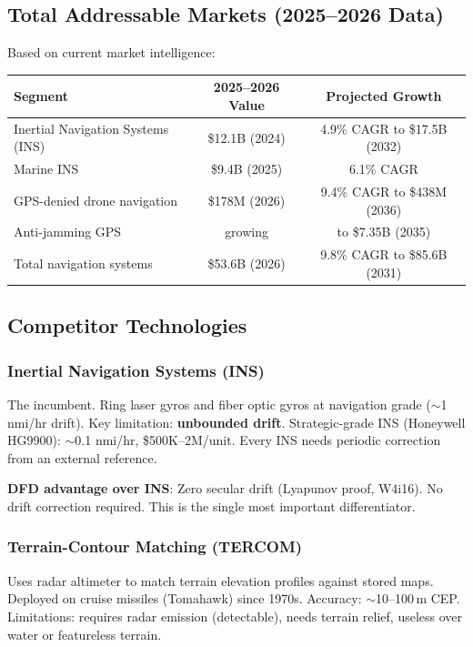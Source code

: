 \documentclass[11pt]{article}
\theoremstyle{definition}
\theoremstyle{remark}
\begin{document}
\subsection{Total Addressable Markets (2025--2026 Data)}

Based on current market intelligence:

\begin{center}
\begin{tabular}{lcc}
\toprule
\textbf{Segment} & \textbf{2025--2026 Value} & \textbf{Projected Growth} \\
\midrule
Inertial Navigation Systems (INS) & \$12.1B (2024) & 4.9\% CAGR to \$17.5B (2032) \\
Marine INS & \$9.4B (2025) & 6.1\% CAGR \\
GPS-denied drone navigation & \$178M (2026) & 9.4\% CAGR to \$438M (2036) \\
Anti-jamming GPS & growing & to \$7.35B (2035) \\
Total navigation systems & \$53.6B (2026) & 9.8\% CAGR to \$85.6B (2031) \\
\bottomrule
\end{tabular}
\end{center}

\subsection{Competitor Technologies}

\subsubsection{Inertial Navigation Systems (INS)}

The incumbent. Ring laser gyros and fiber optic gyros at navigation grade
($\sim$1 nmi/hr drift). Key limitation: \textbf{unbounded drift}.
Strategic-grade INS (Honeywell HG9900): $\sim$0.1 nmi/hr, \$500K--2M/unit.
Every INS needs periodic correction from an external reference.

\textbf{DFD advantage over INS}: Zero secular drift (Lyapunov proof, W4i16).
No drift correction required. This is the single most important differentiator.

\subsubsection{Terrain-Contour Matching (TERCOM)}

Uses radar altimeter to match terrain elevation profiles against stored maps.
Deployed on cruise missiles (Tomahawk) since 1970s. Accuracy: $\sim$10--100\,m CEP.
Limitations: requires radar emission (detectable), needs terrain relief,
useless over water or featureless terrain.
\end{document}
